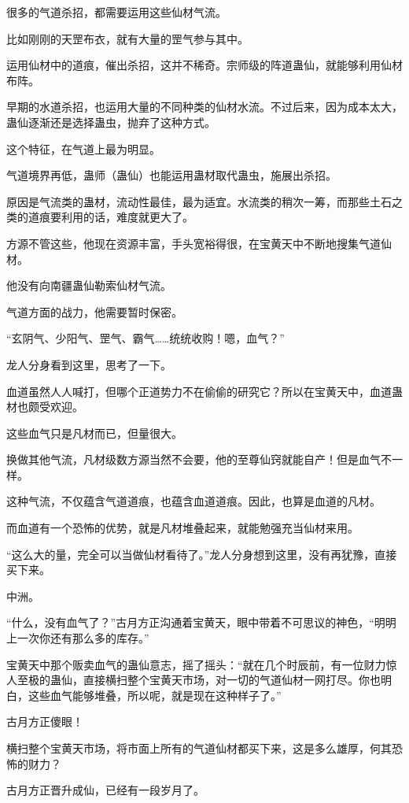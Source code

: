 \begin{this_body}
很多的气道杀招，都需要运用这些仙材气流。

比如刚刚的天罡布衣，就有大量的罡气参与其中。

运用仙材中的道痕，催出杀招，这并不稀奇。宗师级的阵道蛊仙，就能够利用仙材布阵。

早期的水道杀招，也运用大量的不同种类的仙材水流。不过后来，因为成本太大，蛊仙逐渐还是选择蛊虫，抛弃了这种方式。

这个特征，在气道上最为明显。

气道境界再低，蛊师（蛊仙）也能运用蛊材取代蛊虫，施展出杀招。

原因是气流类的蛊材，流动性最佳，最为适宜。水流类的稍次一筹，而那些土石之类的道痕要利用的话，难度就更大了。

方源不管这些，他现在资源丰富，手头宽裕得很，在宝黄天中不断地搜集气道仙材。

他没有向南疆蛊仙勒索仙材气流。

气道方面的战力，他需要暂时保密。

“玄阴气、少阳气、罡气、霸气……统统收购！嗯，血气？”

龙人分身看到这里，思考了一下。

血道虽然人人喊打，但哪个正道势力不在偷偷的研究它？所以在宝黄天中，血道蛊材也颇受欢迎。

这些血气只是凡材而已，但量很大。

换做其他气流，凡材级数方源当然不会要，他的至尊仙窍就能自产！但是血气不一样。

这种气流，不仅蕴含气道道痕，也蕴含血道道痕。因此，也算是血道的凡材。

而血道有一个恐怖的优势，就是凡材堆叠起来，就能勉强充当仙材来用。

“这么大的量，完全可以当做仙材看待了。”龙人分身想到这里，没有再犹豫，直接买下来。

中洲。

“什么，没有血气了？”古月方正沟通着宝黄天，眼中带着不可思议的神色，“明明上一次你还有那么多的库存。”

宝黄天中那个贩卖血气的蛊仙意志，摇了摇头：“就在几个时辰前，有一位财力惊人至极的蛊仙，直接横扫整个宝黄天市场，对一切的气道仙材一网打尽。你也明白，这些血气能够堆叠，所以呢，就是现在这种样子了。”

古月方正傻眼！

横扫整个宝黄天市场，将市面上所有的气道仙材都买下来，这是多么雄厚，何其恐怖的财力？

古月方正晋升成仙，已经有一段岁月了。


\end{this_body}
